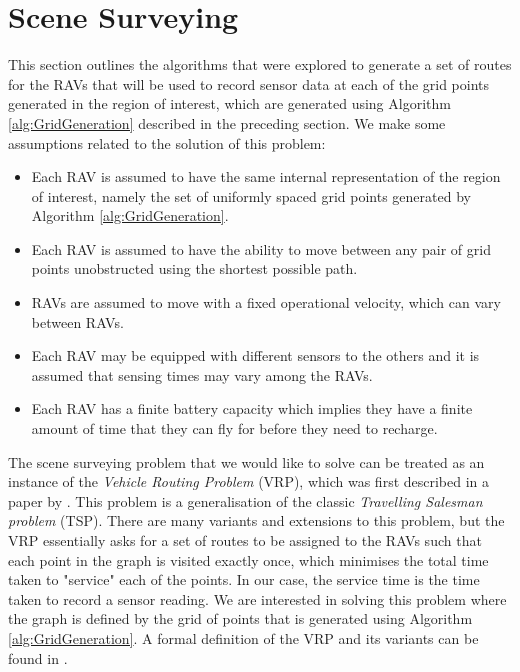 
\section{Scene Surveying}\label{sec:SceneSurveying}
This section outlines the algorithms that were explored to generate a set of routes for the RAVs that will be used to record sensor data at each of the grid points generated in the region of interest, which are generated using Algorithm \ref{alg:GridGeneration} described in the preceding section. We make some assumptions related to the solution of this problem:
\begin{itemize}
    \item Each RAV is assumed to have the same internal representation of the region of interest, namely the set of uniformly spaced grid points generated by Algorithm \ref{alg:GridGeneration}.
    \item Each RAV is assumed to have the ability to move between any pair of grid points unobstructed using the shortest possible path.
    \item RAVs are assumed to move with a fixed operational velocity, which can vary between RAVs.
    \item Each RAV may be equipped with different sensors to the others and it is assumed that sensing times may vary among the RAVs.
    \item Each RAV has a finite battery capacity which implies they have a finite amount of time that they can fly for before they need to recharge.
\end{itemize}


The scene surveying problem that we would like to solve can be treated as an instance of the \textit{Vehicle Routing Problem} (VRP), which was first described in a paper by \citeauthor{Dantzig1959TheProblem} \cite{Dantzig1959TheProblem}. This problem is a generalisation of the classic \textit{Travelling Salesman problem} (TSP). There are many variants and extensions to this problem, but the VRP essentially asks for a set of routes to be assigned to the RAVs such that each point in the graph is visited exactly once, which minimises the total time taken to "service" each of the points. In our case, the service time is the time taken to record a sensor reading. We are interested in solving this problem where the graph is defined by the grid of points that is generated using Algorithm \ref{alg:GridGeneration}. A formal definition of the VRP and its variants can be found in \cite{Toth2002TheProblem}.

